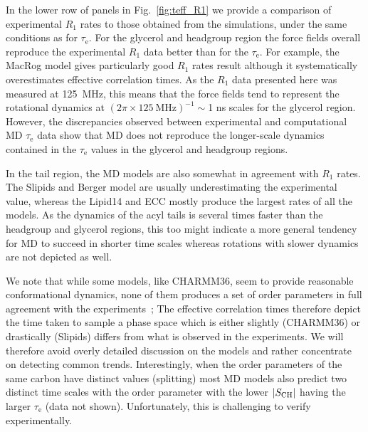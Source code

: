 \documentclass[journal=jpcbfk,manuscript=article,layout=twocolumn]{achemso}
\begin{document}
In the lower row of panels in Fig.~\ref{fig:teff_R1} we provide a comparison of experimental $R_{1}$ rates to those obtained from the simulations, under the same conditions as for $\tau_\mathrm{e}$. For the glycerol and headgroup region the force fields overall reproduce the experimental $R_{1}$ data better than for the $\tau_\mathrm{e}$. For example, the 
MacRog model gives particularly good $R_{1}$ rates result although it systematically overestimates effective correlation times.  As the $R_{1}$ data presented here was measured at 125~MHz, this means that the force fields tend to represent the rotational dynamics at $(2\pi\times125~\mathrm{MHz})^{-1}\sim$1 ns scales for the glycerol region. However, the discrepancies observed between experimental and computational MD $\tau_\mathrm{e}$ data show that MD does not reproduce the longer-scale dynamics contained in the $\tau_\mathrm{e}$ values in the glycerol and headgroup regions.

In the tail region, the MD models are also somewhat in  agreement with $R_{1}$ rates. The Slipids and Berger model are usually underestimating the experimental value, whereas the Lipid14 and ECC mostly produce the largest rates of all the models. As the dynamics of the acyl tails is several times faster than the headgroup and glycerol regions, this too might indicate a more general tendency for MD to succeed in shorter time scales whereas rotations with slower dynamics are not depicted as well.

We note that while some models, like CHARMM36, seem to provide reasonable conformational dynamics, none of them produces a set of order parameters in full agreement with the experiments~\cite{botan15}; The effective correlation times therefore depict the time taken to sample a phase space which is either slightly (CHARMM36) or drastically (Slipids) differs from what is observed in the experiments. We will therefore avoid overly detailed discussion on the models and rather concentrate on detecting common trends. Interestingly, when the order parameters of the same carbon have distinct values (splitting) most MD models also predict two distinct time scales with the order parameter with the lower $|S_{\rm{CH}}|$ having the larger $\tau_\mathrm{e}$ (data not shown). Unfortunately, this is challenging to verify experimentally. 

\end{document}
